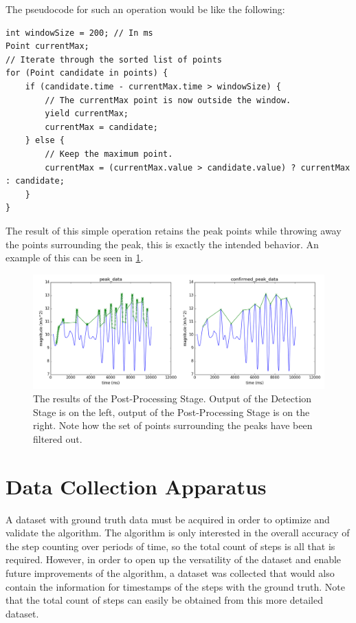             The pseudocode for such an operation would be like the following:

            \begin{lstlisting}
int windowSize = 200; // In ms
Point currentMax;
// Iterate through the sorted list of points
for (Point candidate in points) {
    if (candidate.time - currentMax.time > windowSize) {
        // The currentMax point is now outside the window. 
        yield currentMax;
        currentMax = candidate;
    } else {
        // Keep the maximum point.
        currentMax = (currentMax.value > candidate.value) ? currentMax : candidate;
    }
}
            \end{lstlisting}

            The result of this simple operation retains the peak points while throwing away the points surrounding the peak, this is exactly the intended behavior. An example of this can be seen in \ref{img_post_stage}.

            \begin{figure}[!th]
                \includegraphics[width=\textwidth]{Images/post_stage.png}
                \centering
                \caption{The results of the Post-Processing Stage. Output of the Detection Stage is on the left, output of the Post-Processing Stage is on the right. Note how the set of points surrounding the peaks have been filtered out.}
                \label{img_post_stage}
            \end{figure}

    \chapter{Data Collection Apparatus}

        A dataset with ground truth data must be acquired in order to optimize and validate the algorithm. The algorithm is only interested in the overall accuracy of the step counting over periods of time, so the total count of steps is all that is required. However, in order to open up the versatility of the dataset and enable future improvements of the algorithm, a dataset was collected that would also contain the information for timestamps of the steps with the ground truth. Note that the total count of steps can easily be obtained from this more detailed dataset. 

